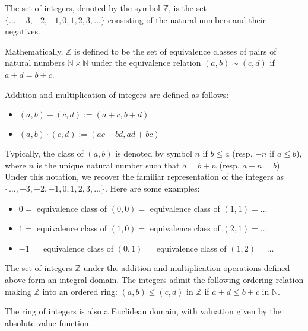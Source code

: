 \documentclass{article}
\begin{document}
The set of integers, denoted by the symbol $\mathbb{Z}$, is the set $\{\dots -3, -2, -1, 0, 1, 2, 3, \dots\}$ consisting of the natural numbers and their negatives.

Mathematically, $\mathbb{Z}$ is defined to be the set of equivalence classes of pairs of natural numbers $\mathbb{N} \times \mathbb{N}$ under the equivalence relation $(a,b) \sim (c,d)$ if $a+d = b+c$.

Addition and multiplication of integers are defined as follows:
\begin{itemize}
\item $(a,b)+(c,d) := (a+c,b+d)$
\item $(a,b)\cdot(c,d) := (ac+bd,ad+bc)$
\end{itemize}
Typically, the class of $(a,b)$ is denoted by symbol $n$ if $b \leq a$ (resp. $-n$ if $a \leq b$), where $n$ is the unique natural number such that $a=b+n$ (resp. $a+n=b$). Under this notation, we recover the familiar representation of the integers as $\{\dots, -3, -2, -1, 0, 1, 2, 3, \dots\}$. Here are some examples:
\begin{itemize}
\item $0 = $ equivalence class of $(0,0) = $ equivalence class of $(1,1) = \dots$
\item $1 = $ equivalence class of $(1,0) = $ equivalence class of $(2,1) = \dots$
\item $-1 = $ equivalence class of $(0,1) = $ equivalence class of $(1,2) = \dots$
\end{itemize}
The set of integers $\mathbb{Z}$ under the addition and multiplication operations defined above form an integral domain. The integers admit the following ordering relation making $\mathbb{Z}$ into an ordered ring: $(a,b) \leq (c,d)$ in $\mathbb{Z}$ if $a+d \leq b+c$ in $\mathbb{N}$.

The ring of integers is also a Euclidean domain, with valuation given by the absolute value function.
\end{document}
